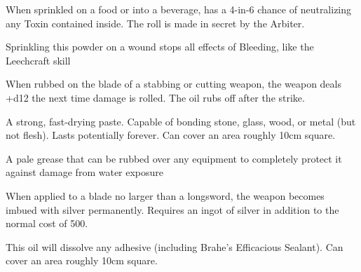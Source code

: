 {\begin{multicols}{2}
  \CHYMISTRY[
    Name=Powdered Bezoar,
    Link=chymistry-powdered-bezoar,
    Cost=500\FE,
    Duration=0 ,
    Toxin=No,
    Narcotic=No 
  ]


  When sprinkled on a food or into a beverage, has a 4-in-6 chance of neutralizing any Toxin contained inside.  The roll is made in secret by the Arbiter.


  \CHYMISTRY[
    Name=Woundseal,
    Link=chymistry-woundseal,
    Cost=500\FE,
    Duration=0 ,
    Toxin=No,
    Narcotic=No 
  ]


  Sprinkling this powder on a wound stops all effects of Bleeding, like the Leechcraft skill 


  \CHYMISTRY[
    Name=Boyle's Sharpening Paste,
    Link=chymistry-boyles-sharpening-paste,
    Cost=500\FE,
    Duration=0 ,
    Toxin=No,
    Narcotic=No 
  ]
  When rubbed on the blade of a stabbing or cutting weapon, the weapon deals +d12 the next time damage is rolled.  The oil rubs off after the strike.


  \CHYMISTRY[
    Name=Brahe's Efficacious Sealant,
    Link=chymistry-brahes-efficacious-sealant,
    Cost=500\AU,
    Duration=0 ,
    Toxin=No,
    Narcotic=No 
  ]
  A strong, fast-drying paste. Capable of bonding stone, glass, wood, or metal (but not flesh). Lasts potentially forever.  Can cover an area roughly 10cm square.


  \CHYMISTRY[
    Name=Faivre's Aqua Grease,
    Link=chymistry-faivres-aqua grease,
    Cost=500\FE,
    Duration=0 ,
    Toxin=No,
    Narcotic=No 
  ]
  A pale grease that can be rubbed over any equipment to completely protect it against damage from water exposure

  \CHYMISTRY[
    Name=Tesla's Silver Wash,
    Link=chymistry-teslas-silver wash,
    Cost=500\AG,
    Duration=0 ,
    Toxin=No,
    Narcotic=No 
  ]
  When applied to a blade no larger than a longsword, the weapon becomes imbued with silver permanently.  Requires an ingot of silver in addition to the normal cost of 500\AG.

  \newpage

  \CHYMISTRY[
    Name=Wei Boyang's Alkahest,
    Link=chymistry-wei boyangs-alkahest,
    Cost=500\AU,
    Duration=0 ,
    Toxin=No,
    Narcotic=No 
  ]

  This oil will dissolve any adhesive (including Brahe's Efficacious Sealant).  Can cover an area roughly 10cm square.




\end{multicols}}
